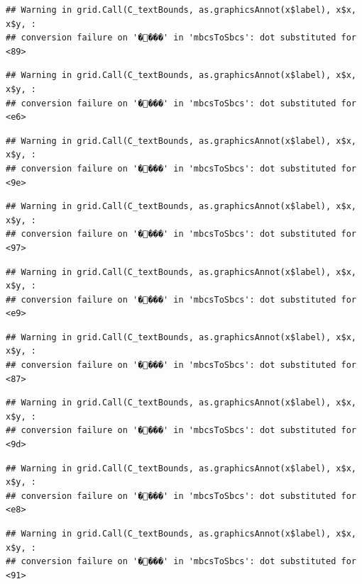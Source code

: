 \documentclass[
]{article}
\begin{document}
\begin{verbatim}
## Warning in grid.Call(C_textBounds, as.graphicsAnnot(x$label), x$x, x$y, :
## conversion failure on '����' in 'mbcsToSbcs': dot substituted for <89>
\end{verbatim}

\begin{verbatim}
## Warning in grid.Call(C_textBounds, as.graphicsAnnot(x$label), x$x, x$y, :
## conversion failure on '����' in 'mbcsToSbcs': dot substituted for <e6>
\end{verbatim}

\begin{verbatim}
## Warning in grid.Call(C_textBounds, as.graphicsAnnot(x$label), x$x, x$y, :
## conversion failure on '����' in 'mbcsToSbcs': dot substituted for <9e>
\end{verbatim}

\begin{verbatim}
## Warning in grid.Call(C_textBounds, as.graphicsAnnot(x$label), x$x, x$y, :
## conversion failure on '����' in 'mbcsToSbcs': dot substituted for <97>
\end{verbatim}

\begin{verbatim}
## Warning in grid.Call(C_textBounds, as.graphicsAnnot(x$label), x$x, x$y, :
## conversion failure on '����' in 'mbcsToSbcs': dot substituted for <e9>
\end{verbatim}

\begin{verbatim}
## Warning in grid.Call(C_textBounds, as.graphicsAnnot(x$label), x$x, x$y, :
## conversion failure on '����' in 'mbcsToSbcs': dot substituted for <87>
\end{verbatim}

\begin{verbatim}
## Warning in grid.Call(C_textBounds, as.graphicsAnnot(x$label), x$x, x$y, :
## conversion failure on '����' in 'mbcsToSbcs': dot substituted for <9d>
\end{verbatim}

\begin{verbatim}
## Warning in grid.Call(C_textBounds, as.graphicsAnnot(x$label), x$x, x$y, :
## conversion failure on '����' in 'mbcsToSbcs': dot substituted for <e8>
\end{verbatim}

\begin{verbatim}
## Warning in grid.Call(C_textBounds, as.graphicsAnnot(x$label), x$x, x$y, :
## conversion failure on '����' in 'mbcsToSbcs': dot substituted for <91>
\end{verbatim}
\end{document}

